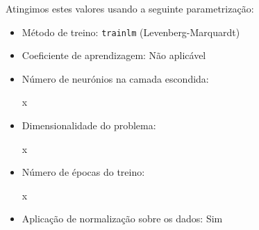\documentclass{article}
\newenvironment{text-red}{\color{red}}{}
\begin{document}
Atingimos estes valores usando a seguinte parametrização:
\begin{itemize}
\item Método de treino: \texttt{trainlm} (Levenberg-Marquardt)
\item Coeficiente de aprendizagem: Não aplicável
\item Número de neurónios na camada escondida: \begin{text-red}x\end{text-red}
\item Dimensionalidade do problema: \begin{text-red}x\end{text-red}
\item Número de épocas do treino: \begin{text-red}x\end{text-red}
\item Aplicação de normalização sobre os dados: Sim
\end{itemize}
\end{document}
